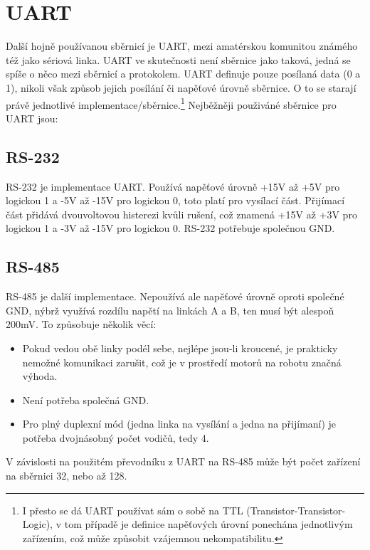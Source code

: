 \section{UART}
Další hojně používanou sběrnicí je UART, mezi amatérskou komunitou známého též jako sériová linka.
UART ve skutečnosti není sběrnice jako taková, jedná se spíše o něco mezi sběrnicí a protokolem.
UART definuje pouze posílaná data (0 a 1), nikoli však způsob jejich posílání či napěťové úrovně sběrnice.
O to se starají právě jednotlivé implementace/sběrnice.\footnote{I přesto se dá UART používat sám o sobě na TTL (Transistor-Transistor-Logic), v tom případě je definice napěťových úrovní ponechána jednotlivým zařízením, což může způsobit vzájemnou nekompatibilitu.}
Nejběžněji použiváné sběrnice pro UART jsou:
\subsection{RS-232} %
RS-232 je implementace UART.
Používá napěťové úrovně +15V až +5V pro logickou 1 a -5V až -15V pro logickou 0, toto platí pro vysílací část.
Přijímací část přidává dvouvoltovou histerezi kvůli rušení, což znamená +15V až +3V pro logickou 1 a -3V až -15V pro logickou 0.
RS-232 potřebuje společnou GND.\cite{RS-232} 
\subsection{RS-485} %
RS-485 je další implementace.
Nepoužívá ale napěťové úrovně oproti společné GND, nýbrž využívá rozdílu napětí na linkách A a B, ten musí být alespoň 200mV.
To způsobuje několik věcí:
\begin{itemize}
	\item Pokud vedou obě linky podél sebe, nejlépe jsou-li kroucené, je prakticky nemožné komunikaci zarušit, což je v prostředí motorů na robotu značná výhoda.
	\item Není potřeba společná GND.
	\item Pro plný duplexní mód (jedna linka na vysílání a jedna na přijímaní) je potřeba dvojnásobný počet vodičů, tedy 4.
\end{itemize}
V závislosti na použitém převodníku z UART na RS-485 může být počet zařízení na sběrnici 32, nebo až 128.
\cite{RS-485}

